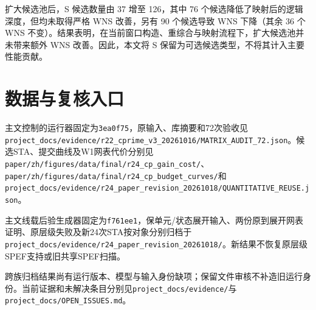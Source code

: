 \documentclass[twocolumn,10pt,fontset=windows]{ctexart}
\begin{document}
扩大候选池后，S 候选数量由 37 增至 126，其中 76 个候选降低了映射后的逻辑深度，但均未取得严格 WNS 改善，另有 90 个候选导致 WNS 下降（其余 36 个 WNS 不变）。结果表明，在当前窗口构造、重综合与映射流程下，扩大候选池并未带来额外 WNS 改善。因此，本文将 S 保留为可选候选类型，不将其计入主要性能贡献。

\section{数据与复核入口}

主文控制的运行器固定为\texttt{3ea0f75}，原输入、库摘要和72次验收见\nolinkurl{project_docs/evidence/r22_cprime_v3_20261016/MATRIX_AUDIT_72.json}。候选STA、提交曲线及W1网表代价分别见\nolinkurl{paper/zh/figures/data/final/r24_cp_gain_cost/}、\nolinkurl{paper/zh/figures/data/final/r24_cp_budget_curves/}和\nolinkurl{project_docs/evidence/r24_paper_revision_20261018/QUANTITATIVE_REUSE.json}。

主文线载后验生成器固定为\texttt{f761ee1}，保单元/状态展开输入、两份原到展开网表证明、原层级失败及新24次STA按对象分别归档于\nolinkurl{project_docs/evidence/r24_paper_revision_20261018/}。新结果不恢复原层级SPEF支持或旧共享SPEF扫描。

跨族归档结果尚有运行版本、模型与输入身份缺项；保留文件审核不补造旧运行身份。当前证据和未解决条目分别见\nolinkurl{project_docs/evidence/}与\nolinkurl{project_docs/OPEN_ISSUES.md}。
\end{document}
